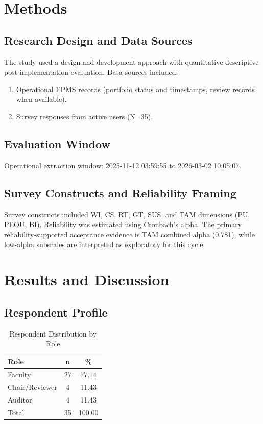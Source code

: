 \documentclass[conference]{IEEEtran}
\begin{document}
\section{Methods}
\subsection{Research Design and Data Sources}
The study used a design-and-development approach with quantitative descriptive post-implementation evaluation. Data sources included:
\begin{enumerate}
    \item Operational FPMS records (portfolio status and timestamps, review records when available).
    \item Survey responses from active users (N=35).
\end{enumerate}

\subsection{Evaluation Window}
Operational extraction window: 2025-11-12 03:59:55 to 2026-03-02 10:05:07.

\subsection{Survey Constructs and Reliability Framing}
Survey constructs included WI, CS, RT, GT, SUS, and TAM dimensions (PU, PEOU, BI). Reliability was estimated using Cronbach's alpha. The primary reliability-supported acceptance evidence is TAM combined alpha (0.781), while low-alpha subscales are interpreted as exploratory for this cycle.

\section{Results and Discussion}
\subsection{Respondent Profile}
\begin{table}[htbp]
\caption{Respondent Distribution by Role}
\centering
\begin{tabular}{lcc}
\toprule
Role & n & \% \\
\midrule
Faculty & 27 & 77.14 \\
Chair/Reviewer & 4 & 11.43 \\
Auditor & 4 & 11.43 \\
\midrule
Total & 35 & 100.00 \\
\bottomrule
\end{tabular}
\end{table}
\end{document}
